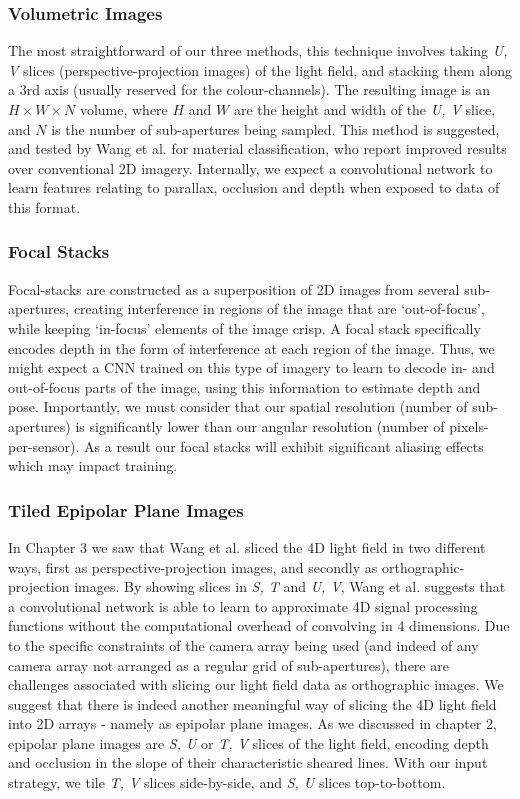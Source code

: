 \subsubsection{Volumetric Images}
The most straightforward of our three methods, this technique involves taking \textit{U, V} slices (perspective-projection images) of the light field, and stacking them along a 3rd axis (usually reserved for the colour-channels). The resulting image is an $H \times W \times N$ volume, where $H$ and $W$ are the height and width of the \textit{U, V} slice, and $N$ is the number of sub-apertures being sampled. This method is suggested, and tested by Wang et al. \cite{wang2016lfcnn} for material classification, who report improved results over conventional 2D imagery. Internally, we expect a convolutional network to learn features relating to parallax, occlusion and depth when exposed to data of this format.

\subsubsection{Focal Stacks}
Focal-stacks are constructed as a superposition of 2D images from several sub-apertures, creating interference in regions of the image that are `out-of-focus', while keeping `in-focus' elements of the image crisp. A focal stack specifically encodes depth in the form of interference at each region of the image. Thus, we might expect a CNN trained on this type of imagery to learn to decode in- and out-of-focus parts of the image, using this information to estimate depth and pose. Importantly, we must consider that our spatial resolution (number of sub-apertures) is significantly lower than our angular resolution (number of pixels-per-sensor). As a result our focal stacks will exhibit significant aliasing effects which may impact training.


\subsubsection{Tiled Epipolar Plane Images}
In Chapter 3 we saw that Wang et al. \cite{wang2016lfcnn} sliced the 4D light field in two different ways, first as perspective-projection images, and secondly as orthographic-projection images. By showing slices in \textit{S, T} and \textit{U, V}, Wang et al. suggests that a convolutional network is able to learn to approximate 4D signal processing functions without the computational overhead of convolving in 4 dimensions. Due to the specific constraints of the camera array being used (and indeed of any camera array not arranged as a regular grid of sub-apertures), there are challenges associated with slicing our light field data as orthographic images. We suggest that there is indeed another meaningful way of slicing the 4D light field into 2D arrays - namely as epipolar plane images. As we discussed in chapter 2, epipolar plane images are \textit{S, U} or \textit{T, V} slices of the light field, encoding depth and occlusion in the slope of their characteristic sheared lines. With our input strategy, we tile \textit{T, V} slices side-by-side, and \textit{S, U} slices top-to-bottom. 

